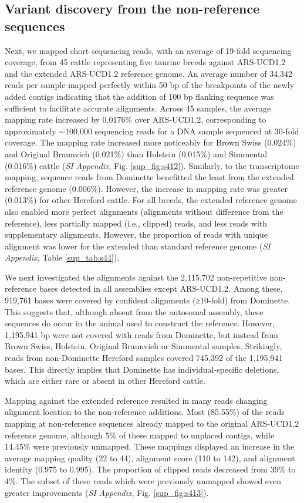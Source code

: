 \documentclass[../main.tex]{subfiles}
\begin{document}
\subsection*{Variant discovery from the non-reference sequences}

Next, we mapped short sequencing reads, with an average of 19-fold sequencing coverage, from 45 cattle representing five taurine breeds against ARS-UCD1.2 and the extended ARS-UCD1.2 reference genome. An average number of 34,342 reads per sample mapped perfectly within 50 bp of the breakpoints of the newly added contigs indicating that the addition of 100 bp flanking sequence was sufficient to facilitate accurate alignments. Across 45 samples, the average mapping rate increased by 0.0176\% over ARS-UCD1.2, corresponding to approximately $\sim$100,000 sequencing reads for a DNA sample sequenced at 30-fold coverage. The mapping rate increased more noticeably for Brown Swiss (0.024\%) and Original Braunvieh (0.021\%) than Holstein (0.015\%) and Simmental (0.016\%) cattle (\emph{SI Appendix}, Fig. \ref{sup_fig:s412}). Similarly, to the transcriptome mapping, sequence reads from Dominette benefitted the least from the extended reference genome (0.006\%). However, the increase in mapping rate was greater (0.013\%) for other Hereford cattle. For all breeds, the extended reference genome also enabled more perfect alignments (alignments without difference from the reference), less partially mapped (i.e., clipped) reads, and less reads with supplementary alignments. However, the proportion of reads with unique alignment was lower for the extended than standard reference genome (\emph{SI Appendix}, Table \ref{sup_tab:s44}). 

We next investigated the alignments against the 2,115,702 non-repetitive non-reference bases detected in all assemblies except ARS-UCD1.2. Among these, 919,761 bases were covered by confident alignments (≥10-fold) from Dominette. This suggests that, although absent from the autosomal assembly, these sequences do occur in the animal used to construct the reference. However, 1,195,941 bp were not covered with reads from Dominette, but instead from Brown Swiss, Holstein, Original Braunvieh or Simmental samples. Strikingly, reads from non-Dominette Hereford samples covered 745,392 of the 1,195,941 bases. This directly implies that Dominette has individual-specific deletions, which are either rare or absent in other Hereford cattle.

Mapping against the extended reference resulted in many reads changing alignment location to the non-reference additions. Most (85.55\%) of the reads mapping at non-reference sequences already mapped to the original ARS-UCD1.2 reference genome, although 5\% of these mapped to unplaced contigs, while 14.45\% were previously unmapped. These mappings displayed an increase in the average mapping quality (22 to 44), alignment score (110 to 142), and alignment identity (0.975 to 0.995). The proportion of clipped reads decreased from 39\% to 4\%. The subset of these reads which were previously unmapped showed even greater improvements (\emph{SI Appendix}, Fig. \ref{sup_fig:s413}).
\end{document}
